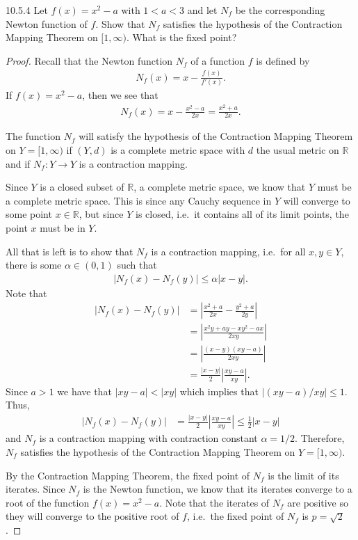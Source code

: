 \begin{problem}{10.5.4}
  Let $f(x) = x^2- a$ with $1 < a < 3$ and let $N_f$ be the corresponding Newton
  function of $f$. Show that $N_f$ satisfies the hypothesis of the Contraction Mapping
  Theorem on $[1, \infty)$. What is the fixed point?
\end{problem}

\begin{proof}
  Recall that the Newton function $N_f$ of a function $f$ is defined by
  \begin{align*}
    N_f(x) = x - \frac{f(x)}{f'(x)}.
  \end{align*}
  If $f(x) = x^2- a$, then we see that
  \begin{align}\label{newton}
    N_f(x) = x - \frac{x^2-a}{2x} = \frac{x^2 + a}{2x}.
  \end{align}

  The function $N_f$ will satisfy the hypothesis of the Contraction Mapping Theorem on
  $Y = [1, \infty)$ if $(Y, d)$ is a complete metric space with $d$ the usual metric on $\mathbb{R}$
  and if $N_f: Y \to Y$ is a contraction mapping.

  Since $Y$ is a closed subset of $\mathbb{R}$, a complete metric space, we know that
  $Y$ must be a complete metric space. This is since any Cauchy sequence in $Y$ will
  converge to some point $x\in \mathbb{R}$, but since $Y$ is closed, i.e.\ it contains
  all of its limit points, the point $x$ must be in $Y$.

  All that is left is to show that $N_f$ is a contraction mapping, i.e.\ for all $x, y \in Y$,
  there is some $\alpha \in (0, 1)$ such that
  \begin{align*}
    |N_f(x) - N_f(y)| \leq \alpha |x - y|.
  \end{align*}
  Note that
  \begin{align*}
    |N_f(x) - N_f(y)| &= \left| \frac{x^2+a}{2x} - \frac{y^2+a}{2y} \right| \\
    &= \left|\frac{x^2y + ay - xy^2 - ax}{2xy}\right| \\
    &= \left|\frac{(x-y)(xy-a)}{2xy}\right| \\
    &= \frac{|x-y|}{2}\left|\frac{xy - a}{xy}\right|.
  \end{align*}
  Since $a > 1$ we have that $|xy-a| < |xy| $ which implies that $|(xy-a)/xy|\leq 1$.
  Thus,
  \begin{align*}
    |N_f(x) - N_f(y)| &= \frac{|x-y|}{2}\left|\frac{xy - a}{xy}\right| \leq \frac{1}{2}|x-y|
  \end{align*}
  and $N_f$ is a contraction mapping with contraction constant $\alpha = 1/2$. Therefore, $N_f$
  satisfies the hypothesis of the Contraction Mapping Theorem on
  $Y = [1, \infty)$.

  By the Contraction Mapping Theorem, the fixed point of $N_f$ is the limit of its iterates.
  Since $N_f$ is the Newton function, we know that its iterates converge to a root of the function $f(x) = x^2-a$.
  Note that the iterates of $N_f$ are positive so they will converge to the positive root of $f$, i.e.\
  the fixed point of $N_f$ is $p=\sqrt{2}$.
\end{proof}
\newpage
